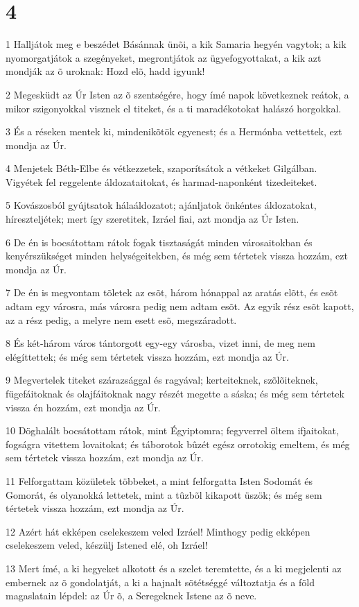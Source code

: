 \chapter{4}

\par 1 Halljátok meg e beszédet Básánnak ünõi, a kik Samaria hegyén vagytok; a kik nyomorgatjátok a szegényeket, megrontjátok az ügyefogyottakat, a kik azt mondják az õ uroknak: Hozd elõ, hadd igyunk!
\par 2 Megesküdt az Úr Isten az õ szentségére, hogy ímé napok következnek reátok, a mikor szigonyokkal visznek el titeket, és a ti maradékotokat halászó horgokkal.
\par 3 És a réseken mentek ki, mindenikõtök egyenest; és a Hermónba vettettek, ezt mondja az Úr.
\par 4 Menjetek Béth-Elbe és vétkezzetek, szaporítsátok a vétkeket Gilgálban. Vigyétek fel reggelente áldozataitokat, és harmad-naponként tizedeiteket.
\par 5 Kovászosból gyújtsatok hálaáldozatot; ajánljatok önkéntes áldozatokat, híreszteljétek; mert így szeretitek, Izráel fiai, azt mondja az Úr Isten.
\par 6 De én is bocsátottam rátok fogak tisztaságát minden városaitokban és kenyérszükséget minden helységeitekben, és még sem tértetek vissza hozzám, ezt mondja az Úr.
\par 7 De én is megvontam tõletek az esõt, három hónappal az aratás elõtt, és esõt adtam egy városra, más városra pedig nem adtam esõt. Az egyik rész esõt kapott, az a rész pedig, a melyre nem esett esõ, megszáradott.
\par 8 És két-három város tántorgott egy-egy városba, vizet inni, de meg nem elégíttettek; és még sem tértetek vissza hozzám, ezt mondja az Úr.
\par 9 Megvertelek titeket szárazsággal és ragyával; kerteiteknek, szõlõiteknek, fügefáitoknak és olajfáitoknak nagy részét megette a sáska; és még sem tértetek vissza én hozzám, ezt mondja az Úr.
\par 10 Döghalált bocsátottam rátok, mint Égyiptomra; fegyverrel öltem ifjaitokat, fogságra vitettem lovaitokat; és táborotok bûzét egész orrotokig emeltem, és még sem  tértetek vissza hozzám, ezt mondja az Úr.
\par 11 Felforgattam közületek többeket, a mint felforgatta Isten Sodomát és Gomorát, és olyanokká lettetek, mint a tûzbõl kikapott üszök; és még sem tértetek vissza hozzám, ezt mondja az Úr.
\par 12 Azért hát ekképen cselekeszem veled Izráel! Minthogy pedig ekképen cselekeszem veled, készülj Istened elé, oh Izráel!
\par 13 Mert ímé, a ki hegyeket alkotott és a szelet teremtette, és a ki megjelenti az embernek az õ gondolatját, a ki a hajnalt sötétséggé változtatja és a föld magaslatain lépdel: az Úr õ, a Seregeknek Istene az õ neve.

